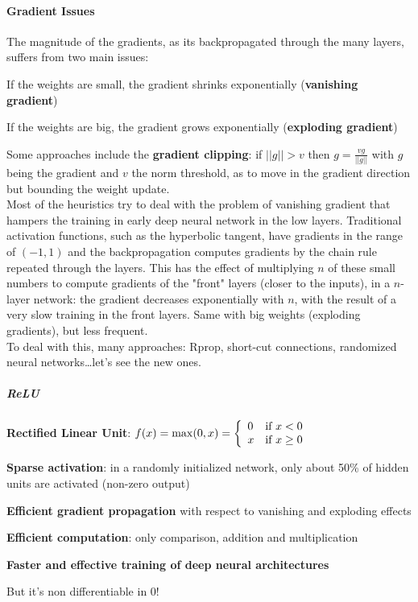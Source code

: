 \documentclass[10pt]{report}
\begin{document}
\paragraph{Gradient Issues} The magnitude of the gradients, as its backpropagated through the many layers, suffers from two main issues:
\begin{list}{}{}
	\item If the weights are small, the gradient shrinks exponentially (\textbf{vanishing gradient})
	\item If the weights are big, the gradient grows exponentially (\textbf{exploding gradient})
\end{list}
Some approaches include the \textbf{gradient clipping}: if $||g||> v$ then $g = \frac{vg}{||g||}$ with $g$ being the gradient and $v$ the norm threshold, as to move in the gradient direction but bounding the weight update.\\
Most of the heuristics try to deal with the problem of vanishing gradient that hampers the training in early deep neural network in the low layers. Traditional activation functions, such as the hyperbolic tangent, have gradients in the range of $(-1,1)$ and the backpropagation computes gradients by the chain rule repeated through the layers. This has the effect of multiplying $n$ of these small numbers to compute gradients of the "front" layers (closer to the inputs), in a $n$-layer network: the gradient decreases exponentially with $n$, with the result of a very slow training in the front layers. Same with big weights (exploding gradients), but less frequent.\\
To deal with this, many approaches: Rprop, short-cut connections, randomized neural networks\ldots let's see the new ones.
\subparagraph{ReLU} \textbf{Rectified Linear Unit}: $f(x) = \max(0,x) = \left\{\begin{array}{l l}
0&\text{if }x< 0\\
x&\text{if }x\geq 0\\
\end{array}\right.$
\begin{list}{}{}
	\item \textbf{Sparse activation}: in a randomly initialized network, only about 50\% of hidden units are activated (non-zero output)
	\item \textbf{Efficient gradient propagation} with respect to vanishing and exploding effects
	\item \textbf{Efficient computation}: only comparison, addition and multiplication
	\item \textbf{Faster and effective training of deep neural architectures}
	\item But it's non differentiable in 0!
\end{list}
\end{document}
